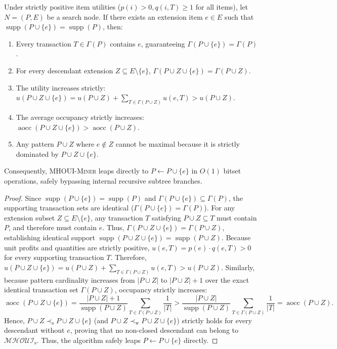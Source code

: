 \documentclass[runningheads]{llncs}
\newcommand{\MHOUI}{\ensuremath{\mathcal{MHOUI}_{\mathrm{s}}}}
\newcommand{\MHOUIminer}{\textsc{MHOUI-Miner}}
\newcommand{\supp}{\operatorname{supp}}
\newcommand{\aocc}{\operatorname{aocc}}
\begin{document}
\begin{theorem}
\label{thm:closure_leap}
Under strictly positive item utilities ($p(i) > 0, q(i, T) \ge 1$ for all items), let $N = (P, E)$ be a search node. If there exists an extension item $e \in E$ such that $\supp(P \cup \{e\}) = \supp(P)$, then:
\begin{enumerate}
    \item Every transaction $T \in \Gamma(P)$ contains $e$, guaranteeing $\Gamma(P \cup \{e\}) = \Gamma(P)$.
    \item For every descendant extension $Z \subseteq E \setminus \{e\}$, $\Gamma(P \cup Z \cup \{e\}) = \Gamma(P \cup Z)$.
    \item The utility increases strictly: $u(P \cup Z \cup \{e\}) = u(P \cup Z) + \sum_{T \in \Gamma(P \cup Z)} u(e, T) > u(P \cup Z)$.
    \item The average occupancy strictly increases: $\aocc(P \cup Z \cup \{e\}) > \aocc(P \cup Z)$.
    \item Any pattern $P \cup Z$ where $e \notin Z$ cannot be maximal because it is strictly dominated by $P \cup Z \cup \{e\}$.
\end{enumerate}
Consequently, \MHOUIminer{} leaps directly to $P \gets P \cup \{e\}$ in $O(1)$ bitset operations, safely bypassing internal recursive subtree branches.
\end{theorem}
\begin{proof}
Since $\supp(P \cup \{e\}) = \supp(P)$ and $\Gamma(P \cup \{e\}) \subseteq \Gamma(P)$, the supporting transaction sets are identical ($\Gamma(P \cup \{e\}) = \Gamma(P)$). For any extension subset $Z \subseteq E \setminus \{e\}$, any transaction $T$ satisfying $P \cup Z \subseteq T$ must contain $P$, and therefore must contain $e$. Thus, $\Gamma(P \cup Z \cup \{e\}) = \Gamma(P \cup Z)$, establishing identical support $\supp(P \cup Z \cup \{e\}) = \supp(P \cup Z)$.
Because unit profits and quantities are strictly positive, $u(e, T) = p(e) \cdot q(e, T) > 0$ for every supporting transaction $T$. Therefore, $u(P \cup Z \cup \{e\}) = u(P \cup Z) + \sum_{T \in \Gamma(P \cup Z)} u(e, T) > u(P \cup Z)$.
Similarly, because pattern cardinality increases from $|P \cup Z|$ to $|P \cup Z| + 1$ over the exact identical transaction set $\Gamma(P \cup Z)$, occupancy strictly increases:
\[
\aocc(P \cup Z \cup \{e\}) = \frac{|P \cup Z| + 1}{\supp(P \cup Z)} \sum_{T \in \Gamma(P \cup Z)} \frac{1}{|T|} > \frac{|P \cup Z|}{\supp(P \cup Z)} \sum_{T \in \Gamma(P \cup Z)} \frac{1}{|T|} = \aocc(P \cup Z).
\]
Hence, $P \cup Z \prec_{\mathrm{s}} P \cup Z \cup \{e\}$ (and $P \cup Z \prec_{\mathrm{w}} P \cup Z \cup \{e\}$) strictly holds for every descendant without $e$, proving that no non-closed descendant can belong to $\MHOUI$. Thus, the algorithm safely leaps $P \gets P \cup \{e\}$ directly.
\end{proof}
\end{document}
